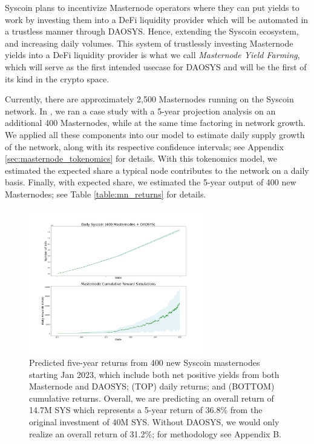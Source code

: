 \documentclass[journal,twocolumn,12pt]{ieeesyscoin}
\begin{document}
Syscoin plans to incentivize Masternode operators where they can put yields to work by investing them into a DeFi liquidity provider which will be automated in a trustless manner through DAOSYS. Hence, extending the Syscoin ecosystem, and increasing daily volumes. This system of trustlessly investing Masternode yields into a DeFi liquidity provider is what we call \textit{Masternode Yield Farming}, which will serve as the first intended usecase for DAOSYS and will be the first of its kind in the crypto space.

Currently, there are approximately 2,500 Masternodes running on the Syscoin network. In \cite{Moo22A}, we ran a case study with a 5-year projection analysis on an additional 400 Masternodes, while at the same time factoring in network growth. We applied all these components into our model to estimate daily supply growth of the network, along with its respective confidence intervals; see Appendix \ref{sec:masternode_tokenomics} for details. With this tokenomics model, we estimated the expected share a typical node contributes to the network on a daily basis. Finally, with expected share, we estimated the 5-year output of 400 new Masternodes; see Table \ref{table:mn_returns} for details.

\begin{figure}[h!]
\includegraphics[width=3in]{img/supply_tot_reward_output.png}
\caption{Predicted five-year returns from 400 new Syscoin masternodes starting Jan 2023, which include both net positive yields from both Masternode and DAOSYS; (TOP) daily returns; and (BOTTOM) cumulative returns. Overall, we are predicting an overall return of 14.7M SYS which represents a 5-year return of 36.8\% from the original investment of 40M SYS. Without DAOSYS, we would only realize an overall return of 31.2\%; for methodology see Appendix B.} 
\label{fig:reward_output}
\end{figure} 
\end{document}
